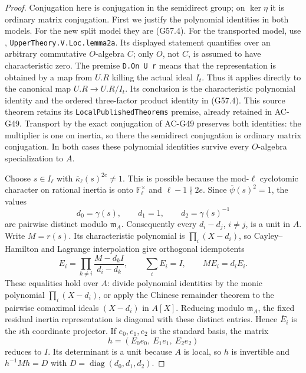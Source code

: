 \begin{proof}
Conjugation here is conjugation in the semidirect group;
on $\ker\eta$ it is ordinary matrix conjugation.
First we justify the polynomial identities in both models.
For the new split model they are (G57.4).  For the transported
model, use
,
\texttt{UpperTheory.V.Loc.lemma2a}.  Its displayed statement
quantifies over an arbitrary commutative $O$-algebra $C$;
only $O$, not $C$, is assumed to have characteristic zero.
The premise \texttt{D.On U r} means that the representation
is obtained by a map from $U.R$ killing the actual ideal
$I_t$.  Thus it applies directly to the canonical map
$U.R\to U.R/I_t$.  Its conclusion is the characteristic
polynomial identity and the ordered three-factor product
identity in (G57.4).  This source theorem retains its
\texttt{LocalPublishedTheorems} premise, already retained
in AC-G49.  Transport by the exact conjugation of AC-G49
preserves both identities: the multiplier is one on
inertia, so there the semidirect conjugation is ordinary
matrix conjugation.  In both cases these polynomial
identities survive every $O$-algebra specialization to $A$.

Choose $s\in I_\ell$ with
$\overline\kappa_\ell(s)^{2e}\ne1$.  This is possible
because the mod-$\ell$ cyclotomic character on rational
inertia is onto $\mathbb F_\ell^\times$ and
$\ell-1\nmid2e$.  Since $\overline\psi(s)^2=1$,
the values
\[
 d_0=\gamma(s),\qquad d_1=1,\qquad d_2=\gamma(s)^{-1}
 \tag{G57I.1}
\]
are pairwise distinct modulo $\mathfrak m_A$.
Consequently every $d_i-d_j$, $i\ne j$, is a unit in $A$.
Write $M=r(s)$.  Its characteristic polynomial is
$\prod_i(X-d_i)$, so Cayley--Hamilton and Lagrange
interpolation give orthogonal idempotents
\[
 E_i=\prod_{k\ne i}\frac{M-d_k I}{d_i-d_k},\qquad
 \sum_iE_i=I,\qquad ME_i=d_iE_i.                 \tag{G57I.2}
\]
These equalities hold over $A$: divide polynomial identities
by the monic polynomial $\prod_i(X-d_i)$, or apply the
Chinese remainder theorem to the pairwise comaximal ideals
$(X-d_i)$ in $A[X]$.  Reducing modulo $\mathfrak m_A$, the
fixed residual inertia representation is diagonal with
these distinct entries.  Hence $\overline E_i$ is the
$i$th coordinate projector.  If $e_0,e_1,e_2$ is the
standard basis, the matrix
\[
             h=(E_0e_0,\ E_1e_1,\ E_2e_2)       \tag{G57I.3}
\]
reduces to $I$.  Its determinant is a unit because $A$ is
local, so $h$ is invertible and $h^{-1}Mh=D$ with
$D=\operatorname{diag}(d_0,d_1,d_2)$.


\end{proof}
